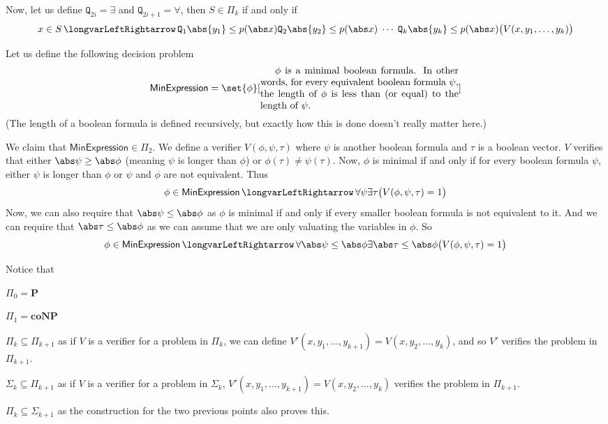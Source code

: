 \documentclass[10pt]{article}
\def\iff{\,\longvarLeftRightarrow\,}
\def\quant{\mathtt{Q}}
\def\minexpr{\mathsf{MinExpression}}
\def\P{\mathbf{P}}
\def\coNP{\mathbf{coNP}}
\begin{document}
Now, let us define $\quant_{2i}=\exists$ and $\quant_{2i+1}=\forall$, then $S\in\Pi_k$ if and only if
\[ x\in S \iff \quant_1 \abs{y_1}\leq p(\abs x)\quant_2 \abs{y_2}\leq p(\abs x)\;\cdots\;\quant_k \abs{y_k}\leq p(\abs x)\bigl(V(x,y_1,\dots,y_k)\bigr) \]

\begin{exam*}

    Let us define the following decision problem
    \[ \minexpr = \set{\phi}[\vcenter{\advance\hsize by-5cm
    $\phi$ is a minimal boolean formula.
    In other words, for every equivalent boolean formula $\psi$, the length of $\phi$ is less than (or equal) to the length of $\psi$.}] \]
    (The length of a boolean formula is defined recursively, but exactly how this is done doesn't really matter here.)

    We claim that $\minexpr\in\Pi_2$.
    We define a verifier $V(\phi,\psi,\tau)$ where $\psi$ is another boolean formula and $\tau$ is a boolean vector.
    $V$ verifies that either $\abs\psi\geq\abs\phi$ (meaning $\psi$ is longer than $\phi$) or $\phi(\tau)\neq\psi(\tau)$.
    Now, $\phi$ is minimal if and only if for every boolean formula $\psi$, either $\psi$ is longer than $\phi$ or $\psi$ and $\phi$ are not equivalent.
    Thus
    \[ \phi\in\minexpr \iff \forall\psi \exists\tau\bigl(V(\phi,\psi,\tau)=1\bigr) \]
    Now, we can also require that $\abs\psi\leq\abs\phi$ as $\phi$ is minimal if and only if every smaller boolean formula is not equivalent to it.
    And we can require that $\abs\tau\leq\abs\phi$ as we can assume that we are only valuating the variables in $\phi$.
    So
    \[ \phi\in\minexpr \iff \forall\abs \psi\leq\abs\phi \exists\abs\tau\leq\abs\phi\bigl(V(\phi,\psi,\tau)=1\bigr) \]

\end{exam*}

Notice that
\benum
    \item $\Pi_0=\P$
    \item $\Pi_1=\coNP$
    \item $\Pi_k\subseteq\Pi_{k+1}$ as if $V$ is a verifier for a problem in $\Pi_k$, we can define $V'(x,y_1,\dots,y_{k+1})=V(x,y_2,\dots,y_k)$, and so $V'$ verifies the problem in $\Pi_{k+1}$.
    \item $\Sigma_k\subseteq\Pi_{k+1}$ as if $V$ is a verifier for a problem in $\Sigma_k$, $V'(x,y_1,\dots,y_{k+1})=V(x,y_2,\dots,y_k)$ verifies the problem in $\Pi_{k+1}$.
    \item $\Pi_k\subseteq\Sigma_{k+1}$ as the construction for the two previous points also proves this.
\eenum
\end{document}
